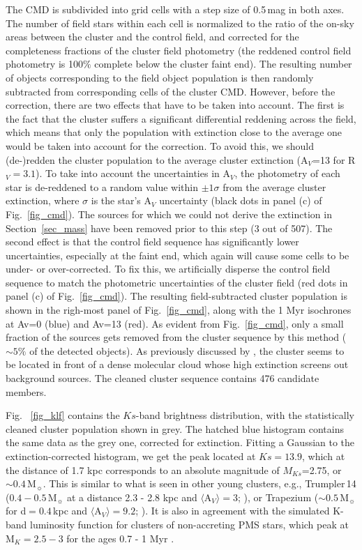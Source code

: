 \documentclass[a4paper,fleqn,usenatbib]{mnras}
\begin{document}
The CMD is subdivided into grid cells with a step size of 0.5\,mag in both axes. The number of field stars
within each cell is normalized to the ratio of the on-sky areas between the cluster and the control field, 
and corrected for the completeness fractions of the cluster field photometry (the reddened control field photometry is 100$\%$
complete below the cluster faint end). 
The resulting number of objects corresponding to the field object population
is then randomly subtracted from corresponding cells of the cluster CMD.
However, before the correction, there are two effects that have to be taken into account. The first is the fact
that the cluster suffers a significant differential reddening across the field, which means that only the population 
with extinction close to the average one would be taken into account for the correction. To avoid this, we should (de-)redden the cluster population 
to the average cluster extinction (A$_V$=13 for R$_V=3.1$). To take into account the uncertainties in A$_V$, the photometry of each star is de-reddened
to a random value within $\pm 1\sigma$ from the average cluster extinction, where $\sigma$ is the star's A$_V$ uncertainty (black dots in panel (c) of Fig.~\ref{fig_cmd}). 
The sources for which we could not derive the extinction in Section~\ref{sec_mass} have been removed prior to this step (3 out of 507).
The second effect is that the control field sequence has significantly lower uncertainties, 
especially at the faint end, which again will cause some cells to be under- or over-corrected. To fix this, we artificially
disperse the control field sequence to match the photometric uncertainties of the cluster field (red dots in panel (c) of Fig.~\ref{fig_cmd}).   
The resulting
field-subtracted cluster population is shown in the righ-most panel of Fig.~\ref{fig_cmd}, along with the 1 Myr isochrones 
at Av=0 (blue) and Av=13 (red).
As evident from Fig.~\ref{fig_cmd}, only a small fraction of the sources gets removed from the cluster sequence by
this method ($\sim 5\%$ of the detected objects). As previously discussed by \citet{derose09}, the cluster seems to be located
in front of a dense molecular cloud whose high extinction screens out background sources. The cleaned cluster 
sequence contains 476 candidate members.

Fig. ~\ref{fig_klf} contains the $Ks$-band brightness distribution, with the statistically cleaned cluster population shown in grey. The hatched 
blue histogram contains the same data as the grey one, corrected for extinction. Fitting a Gaussian to the extinction-corrected histogram,
we get the peak located at $Ks=13.9$,
which at the distance of 1.7 kpc corresponds to an absolute magnitude of $M_{Ks}$=2.75, or $\sim 0.4\,$M$_{\sun}$.
This is similar to what is seen in other young clusters, e.g., Trumpler\,14 ($0.4-0.5\,$M$_{\sun}$ at a distance 2.3 - 2.8 kpc and 
$\langle $A$_V \rangle =3$; \citealt{ascenso07, rochau11}), or Trapezium ($\sim0.5$\,M$_{\sun}$ for d$=0.4$\,kpc and 
$\langle $A$_V \rangle =9.2$; \citealt{muench02}). 
It is also in agreement with the simulated K-band luminosity function for clusters of non-accreting PMS stars,
which peak at M$_K=2.5-3$ for the ages 0.7 - 1 Myr  \citep{zinnecker91}.
\end{document}
